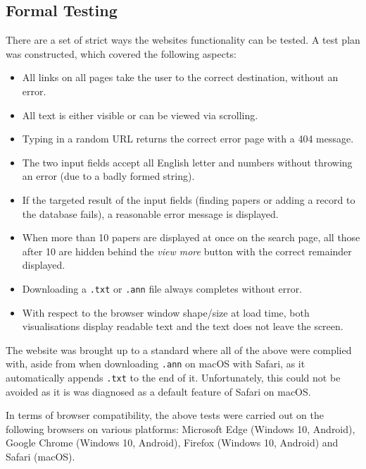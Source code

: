 \subsection*{Formal Testing}
There are a set of strict ways the websites functionality can be tested. A test plan was constructed, which covered the following aspects:
\begin{itemize}
	\item All links on all pages take the user to the correct destination, without an error.
	\item All text is either visible or can be viewed via scrolling.
	\item Typing in a random URL returns the correct error page with a 404 message.
	\item The two input fields accept all English letter and numbers without throwing an error (due to a badly formed string).
	\item If the targeted result of the input fields (finding papers or adding a record to the database fails), a reasonable error message is displayed.
	\item When more than 10 papers are displayed at once on the search page, all those after 10 are hidden behind the \textit{view more} button with the correct remainder displayed.
	\item Downloading a \texttt{.txt} or \texttt{.ann} file always completes without error.
	\item With respect to the browser window shape/size at load time, both visualisations display readable text and the text does not leave the screen.
\end{itemize}

The website was brought up to a standard where all of the above were complied with, aside from when downloading \texttt{.ann} on macOS with Safari, as it automatically appends \texttt{.txt} to the end of it. Unfortunately, this could not be avoided as it is was diagnosed as a default feature of Safari on macOS.

In terms of browser compatibility, the above tests were carried out on the following browsers on various platforms: Microsoft Edge (Windows 10, Android), Google Chrome (Windows 10, Android), Firefox (Windows 10, Android) and Safari (macOS). 

